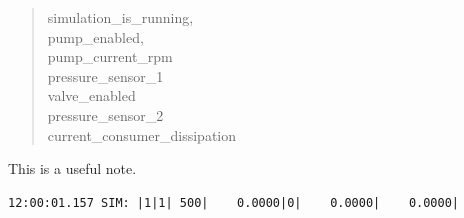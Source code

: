 \documentclass[11pt]{article}
\begin{document}
\begin{quote}
simulation\_is\_running,\\
pump\_enabled,\\
pump\_current\_rpm\\
pressure\_sensor\_1\\
valve\_enabled\\
pressure\_sensor\_2\\
current\_consumer\_dissipation\\
\end{quote}

\begin{note}
This is a useful note.\\
\end{note}



\begin{verbatim}
12:00:01.157 SIM: |1|1| 500|    0.0000|0|    0.0000|    0.0000|
\end{verbatim}
\end{document}

